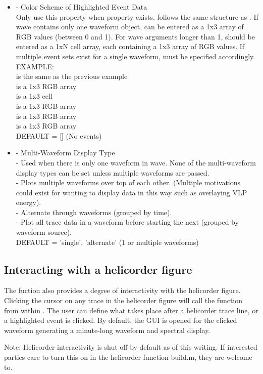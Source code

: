 \documentclass[11pt]{article}
\begin{document}
\begin{itemize}
\item {} - Color Scheme of Highlighted Event Data\\
Only use this property when  property exists.  follows the same structure as . If wave contains only one waveform object,  can be entered as a 1x3 array of RGB values (between 0 and 1). For wave arguments longer than 1,  should be entered as a 1xN cell array, each containing a 1x3 array of RGB values. If multiple event sets exist for a single waveform,  must be specified accordingly.\\
EXAMPLE: \\
 is the same as the previous example\\
 is a 1x3 RGB array\\
 is a 1x3 cell\\
 is a 1x3 RGB array\\
 is a 1x3 RGB array\\
 is a 1x3 RGB array\\
DEFAULT = [] (No events)

\item {} - Multi-Waveform Display Type\\
 - Used when there is only one waveform in wave. None of the multi-waveform display types can be set unless multiple waveforms are passed.\\
 - Plots multiple waveforms over top of each other. (Multiple motivations could exist for wanting to display data in this way such as overlaying VLP energy).\\
 - Alternate through waveforms (grouped by time).\\
 - Plot all trace data in a waveform before starting the next (grouped by waveform source).\\
DEFAULT = 'single', 'alternate' (1 or multiple waveforms)

\end{itemize}

\subsection{Interacting with a helicorder figure}

The  fuction also provides a degree of interactivity with the helicorder figure. Clicking the cursor on any trace in the helicorder figure will call the function  from within . The user can define what takes place after a helicorder trace line, or a highlighted event is clicked. By default, the GUI  is opened for the clicked waveform generating a minute-long waveform and spectral display.

Note: Helicorder interactivity is shut off by default as of this writing. If interested parties care to turn this on in the helicorder function build.m, they are welcome to.

\clearpage
\end{document}
